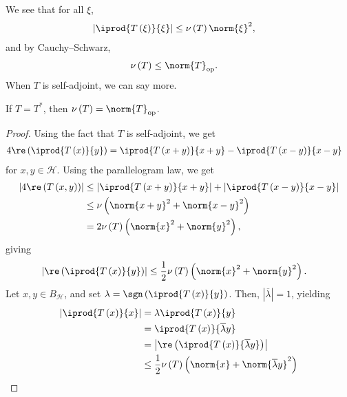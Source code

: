 \documentclass[10pt]{mypackage}
\begin{document}
We see that for all $\xi$,
\begin{align*}
  \left\vert \iprod{T\left(\xi\right)}{\xi} \right\vert &\leq \nu\left(T\right)\norm{\xi}^2,
\end{align*}
and by Cauchy--Schwarz,
\begin{align*}
  \nu\left(T\right) &\leq \norm{T}_{\text{op}}.
\end{align*}
When $T$ is self-adjoint, we can say more.
\begin{proposition}
  If $T = T^{\ast}$, then $\nu\left(T\right) = \norm{T}_{\text{op}}$.
\end{proposition}
\begin{proof}
  Using the fact that $T$ is self-adjoint, we get
  \begin{align*}
    4\re\left( \iprod{T\left(x\right)}{y}\right) &= \iprod{T\left(x+y\right)}{x+y} - \iprod{T\left(x-y\right)}{x-y}
  \end{align*}
  for $x,y\in \mathcal{H}$. Using the parallelogram law, we get
  \begin{align*}
    \left\vert 4\re\left(T\left(x,y\right)\right) \right\vert &\leq \left\vert \iprod{T\left(x+y\right)}{x+y} \right\vert + \left\vert \iprod{T\left(x-y\right)}{x-y} \right\vert\\
                                                              &\leq \nu\left(\norm{x+y}^2 + \norm{x-y}^2\right)\\
                                                              &= 2\nu\left(T\right)\left(\norm{x}^2 + \norm{y}^2\right),
  \end{align*}
  giving
  \begin{align*}
    \left\vert \re\left( \iprod{T\left(x\right)}{y}\right) \right\vert &\leq \frac{1}{2}\nu\left(T\right)\left(\norm{x}^2 + \norm{y}^2\right).
  \end{align*}
  Let $x,y\in B_{\mathcal{H}}$, and set $\lambda = \sgn\left( \iprod{T\left(x\right)}{y}\right)$. Then, $\left\vert \overline{\lambda} \right\vert = 1$, yielding
  \begin{align*}
    \left\vert \iprod{T\left(x\right)}{x} \right\vert &= \lambda \iprod{T\left(x\right)}{y}\\
                                                      &= \iprod{T\left(x\right)}{\overline{\lambda}y}\\
                                                      &= \left\vert \re\left( \iprod{T\left(x\right)}{\overline{\lambda}y}\right) \right\vert\\
                                                      &\leq \frac{1}{2}\nu\left(T\right) \left(\norm{x} + \norm{\overline{\lambda}y}^2\right)\\

\end{align*}
\end{proof}
\end{document}
